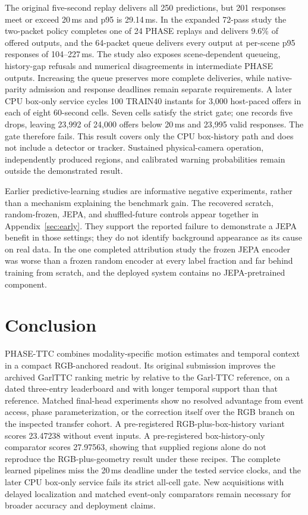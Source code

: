 The original five-second replay delivers all 250 predictions, but 201 responses meet or exceed 20\,ms and p95 is 29.14\,ms. In the expanded 72-pass study the two-packet policy completes one of 24 PHASE replays and delivers 9.6\% of offered outputs, and the 64-packet queue delivers every output at per-scene p95 responses of 104--227\,ms. The study also exposes scene-dependent queueing, history-gap refusals and numerical disagreements in intermediate PHASE outputs. Increasing the queue preserves more complete deliveries, while native-parity admission and response deadlines remain separate requirements. A later CPU box-only service cycles 100 TRAIN40 instants for 3,000 host-paced offers in each of eight 60-second cells. Seven cells satisfy the strict gate; one records five drops, leaving 23,992 of 24,000 offers below 20\,ms and 23,995 valid responses. The gate therefore fails. This result covers only the CPU box-history path and does not include a detector or tracker. Sustained physical-camera operation, independently produced regions, and calibrated warning probabilities remain outside the demonstrated result.

Earlier predictive-learning studies are informative negative experiments, rather than a mechanism explaining the benchmark gain. The recovered scratch, random-frozen, JEPA, and shuffled-future controls appear together in Appendix~\ref{sec:early}. They support the reported failure to demonstrate a JEPA benefit in those settings; they do not identify background appearance as its cause on real data. In the one completed attribution study the frozen JEPA encoder was worse than a frozen random encoder at every label fraction and far behind training from scratch, and the deployed system contains no JEPA-pretrained component.

\section{Conclusion}
PHASE-TTC combines modality-specific motion estimates and temporal context in a compact RGB-anchored readout. Its original submission improves the archived GarlTTC ranking metric by \OfficialOverallRelativeGain{} relative to the Garl-TTC reference, on a dated three-entry leaderboard and with longer temporal support than that reference. Matched final-head experiments show no resolved advantage from event access, phase parameterization, or the correction itself over the RGB branch on the inspected transfer cohort. A pre-registered RGB-plus-box-history variant scores 23.47238 without event inputs. A pre-registered box-history-only comparator scores 27.97563, showing that supplied regions alone do not reproduce the RGB-plus-geometry result under these recipes. The complete learned pipelines miss the 20\,ms deadline under the tested service clocks, and the later CPU box-only service fails its strict all-cell gate. New acquisitions with delayed localization and matched event-only comparators remain necessary for broader accuracy and deployment claims.
\FloatBarrier
